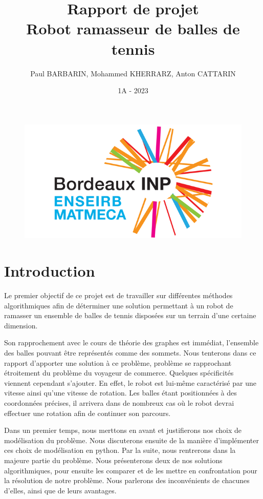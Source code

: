 \documentclass[12pt]{article}
\title{Rapport de projet \\ \textbf{Robot ramasseur de balles de tennis}}
\author{Paul BARBARIN, Mohammed KHERRARZ, Anton CATTARIN}
\date{1A - 2023}
\begin{document}
    \begin{titlepage}

        \begin{figure}
            \centering
            \includegraphics{img/enseirb}
        \end{figure}
        \maketitle

    \end{titlepage}

    \tableofcontents
    \pagebreak
    
    \section{Introduction}

    Le premier objectif de ce projet est de travailler sur différentes méthodes algorithmiques afin de déterminer une solution permettant à un robot de ramasser un ensemble de balles de tennis disposées sur un terrain d'une certaine dimension.

    Son rapprochement avec le cours de théorie des graphes est immédiat, l'ensemble des balles pouvant être représentés comme des sommets. Nous tenterons dans ce rapport d'apporter une solution à ce problème, problème se rapprochant étroitement du problème du voyageur de commerce.
    Quelques spécificités viennent cependant s'ajouter. En effet, le robot est lui-même caractérisé par une vitesse ainsi qu'une vitesse de rotation. Les balles étant positionnées à des coordonnées précises, il arrivera dans de nombreux cas où le robot devrai effectuer une rotation afin de continuer son parcours.

    Dans un premier temps, nous merttons en avant et justifierons nos choix de modélisation du problème. Nous discuterons ensuite de la manière d'implémenter ces choix de modélisation en python. Par la suite, nous rentrerons dans la majeure partie du problème. Nous présenterons deux de nos solutions algorithmiques, pour ensuite les comparer et de les mettre en confrontation pour la résolution de notre problème. Nous parlerons des inconvénients de chacunes d'elles, ainsi que de leurs avantages.
\end{document}
